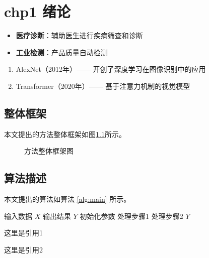 
\chapter{chp1 绪论}

\begin{itemize}
    \item \textbf{医疗诊断}：辅助医生进行疾病筛查和诊断
    \item \textbf{工业检测}：产品质量自动检测
\end{itemize}

\begin{enumerate}
    \item AlexNet（2012年）—— 开创了深度学习在图像识别中的应用
    \item Transformer（2020年）—— 基于注意力机制的视觉模型
\end{enumerate}

\section{整体框架}
本文提出的方法整体框架如图\ref{fig:framework}所示。

\begin{figure}[htbp]
    \centering
    \caption{方法整体框架图}
    \label{fig:framework}
\end{figure}

\section{算法描述}
本文提出的算法如算法 \ref{alg:main} 所示。

\begin{algorithm}[htbp]
    \caption{主要算法}
    \label{alg:main}
    \begin{algorithmic}[1]
        \REQUIRE 输入数据 $X$
        \ENSURE 输出结果 $Y$
        \STATE 初始化参数
            \STATE 处理步骤1
            \STATE 处理步骤2
        \ENDFOR
        \RETURN $Y$
    \end{algorithmic}
\end{algorithm}

这里是引用1\cite{krizhevsky2012imagenet}

这里是引用2\cite{vaswani2017attention}  

